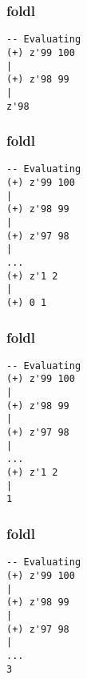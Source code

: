 \documentclass{beamer}
\begin{document}
\begin{frame}[t,fragile]
\frametitle{foldl}
\begin{verbatim}
-- Evaluating
(+) z'99 100
|
(+) z'98 99
|
z'98
\end{verbatim}
\end{frame}

\begin{frame}[t,fragile]
\frametitle{foldl}
\begin{verbatim}
-- Evaluating
(+) z'99 100
|
(+) z'98 99
|
(+) z'97 98
|
...
(+) z'1 2
|
(+) 0 1
\end{verbatim}
\end{frame}

\begin{frame}[t,fragile]
\frametitle{foldl}
\begin{verbatim}
-- Evaluating
(+) z'99 100
|
(+) z'98 99
|
(+) z'97 98
|
...
(+) z'1 2
|
1
\end{verbatim}
\end{frame}

\begin{frame}[t,fragile]
\frametitle{foldl}
\begin{verbatim}
-- Evaluating
(+) z'99 100
|
(+) z'98 99
|
(+) z'97 98
|
...
3
\end{verbatim}
\end{frame}
\end{document}
